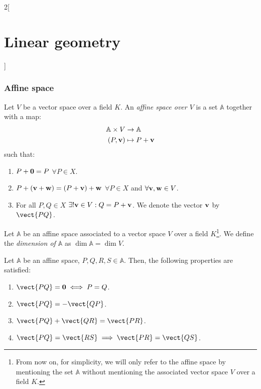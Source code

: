\documentclass[../../../main.tex]{subfiles}
\begin{document}
\begin{multicols}{2}[\section{Linear geometry}]
    \subsubsection*{Affine space}
    \begin{definition}
        Let $V$ be a vector space over a field $K$. An \textit{affine space over $V$} is a set $\mathbb{A}$ together with a map:
        \begin{align*}
            \mathbb{A}\times V & \rightarrow \mathbb{A}  \\
            (P,\vb{v})  & \mapsto P+\vb{v}
        \end{align*}
        such that:
        \begin{enumerate}
            \item $P+\vb{0}=P$ $\forall P\in X$.
            \item $P+(\vb{v}+\vb{w})=(P+\vb{v})+\vb{w}$ $\forall P\in X$ and $\forall\vb{v},\vb{w}\in V$.
            \item For all $P,Q\in X$ $\exists!\vb{v}\in V:Q=P+\vb{v}$. We denote the vector $\vb{v}$ by $\vect{PQ}$.
        \end{enumerate}
    \end{definition}
    \begin{definition}
        Let $\mathbb{A}$ be an affine space associated to a vector space $V$ over a field $K$\footnote{From now on, for simplicity, we will only refer to the affine space by mentioning the set $\mathbb{A}$ without mentioning the associated vector space $V$ over a field $K$.}. We define the \textit{dimension of $\mathbb{A}$} as $\dim\mathbb{A}=\dim V$.
    \end{definition}
    \begin{prop}
        Let $\mathbb{A}$ be an affine space, $P,Q,R,S\in\mathbb{A}$. Then, the following properties are satisfied:
        \begin{enumerate}
            \item $\vect{PQ}=\mathblack{0}\iff P=Q$.
            \item $\vect{PQ}=-\vect{QP}$.
            \item $\vect{PQ}+\vect{QR}=\vect{PR}$.
            \item $\vect{PQ}=\vect{RS}\implies\vect{PR}=\vect{QS}$.
        \end{enumerate}
    \end{prop}
    \begin{definition}

\end{definition}
\end{multicols}
\end{document}
